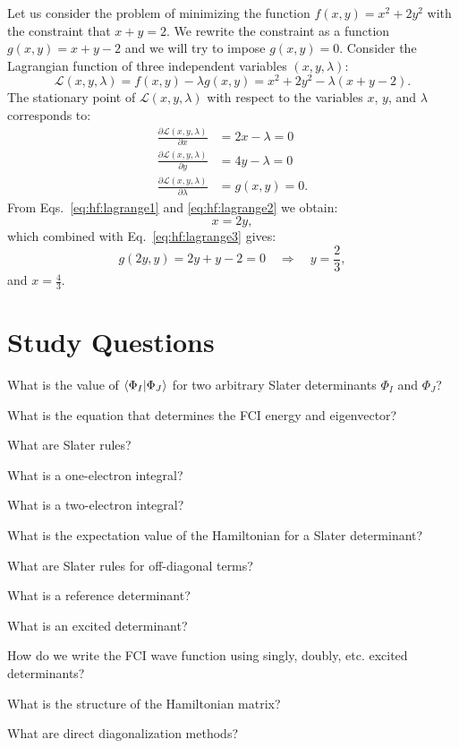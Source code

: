 \documentclass[../Main/chem532-notes.tex]{subfiles}
\begin{document}
\begin{example}
Let us consider the problem of minimizing the function $f(x,y) = x^2 + 2 y^2$ with the constraint that $x + y = 2$.
We rewrite the constraint as a function $g(x,y) = x + y - 2$ and we will try to impose $g(x,y) = 0$.
Consider the Lagrangian function of three independent variables $(x,y,\lambda)$:
\begin{equation}
\mathcal{L}(x,y,\lambda) = f(x,y) - \lambda g(x,y) =  x^2 + 2 y^2 - \lambda (x + y - 2).
\end{equation}
The stationary point of $\mathcal{L}(x,y,\lambda)$ with respect to the variables $x$, $y$, and $\lambda$ corresponds to:
\begin{align}
\frac{\partial \mathcal{L}(x,y,\lambda)}{\partial x} &= 2 x - \lambda = 0 \label{eq:hf:lagrange1}\\
\frac{\partial \mathcal{L}(x,y,\lambda)}{\partial y} &= 4 y - \lambda = 0 \label{eq:hf:lagrange2}\\
\frac{\partial \mathcal{L}(x,y,\lambda)}{\partial \lambda} &= g(x,y)  = 0.\label{eq:hf:lagrange3}
\end{align}
From Eqs.~\eqref{eq:hf:lagrange1} and \eqref{eq:hf:lagrange2} we obtain:
\begin{equation}
x = 2y,
\end{equation}
which combined with Eq.~\eqref{eq:hf:lagrange3} gives: 
\begin{equation}
g(2y,y)  = 2y + y - 2 = 0 \quad \Rightarrow \quad y = \frac{2}{3},
\end{equation}
and $x = \frac{4}{3}$.
\end{example}

\section*{Study Questions}
\begin{myenumerate}
\item What is the value of $\braket{\Phi_I | \Phi_J}$ for two arbitrary Slater determinants $\Phi_I$ and $\Phi_J$?
\item What is the equation that determines the FCI energy and eigenvector?
\item What are Slater rules?
\item What is a one-electron integral?
\item What is a two-electron integral?
\item What is the expectation value of the Hamiltonian for a Slater determinant?
\item What are Slater rules for off-diagonal terms?
\item What is a reference determinant?
\item What is an excited determinant?
\item How do we write the FCI wave function using singly, doubly, etc. excited determinants?
\item What is the structure of the Hamiltonian matrix?
\item What are direct diagonalization methods?
\end{myenumerate}
\end{document}
